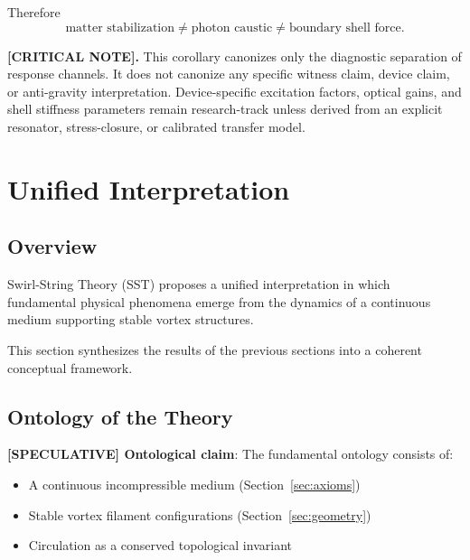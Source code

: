 \documentclass[11pt]{article}
\theoremstyle{definition}
\theoremstyle{plain}
\theoremstyle{remark}
\begin{document}
        Therefore
        \begin{equation}
        \boxed{
        \text{matter stabilization}
        \neq
        \text{photon caustic}
        \neq
        \text{boundary shell force}.
        }
        \end{equation}

        \textbf{[CRITICAL NOTE].}
        This corollary canonizes only the diagnostic separation of response channels.
        It does not canonize any specific witness claim, device claim, or anti-gravity
        interpretation. Device-specific excitation factors, optical gains, and shell
        stiffness parameters remain research-track unless derived from an explicit
        resonator, stress-closure, or calibrated transfer model.



        
\section{Unified Interpretation}
    \label{sec:unification}
    
    \subsection{Overview}
        
        Swirl-String Theory (SST) proposes a unified interpretation in which fundamental physical phenomena emerge from the dynamics of a continuous medium supporting stable vortex structures.
        
        This section synthesizes the results of the previous sections into a coherent conceptual framework.
    
    \subsection{Ontology of the Theory}
        
        \textbf{[SPECULATIVE] Ontological claim}:
        The fundamental ontology consists of:
        
        \begin{itemize}
            \item A continuous incompressible medium (Section~\ref{sec:axioms})
            \item Stable vortex filament configurations (Section~\ref{sec:geometry})
            \item Circulation as a conserved topological invariant
        \end{itemize}
        
\end{document}
